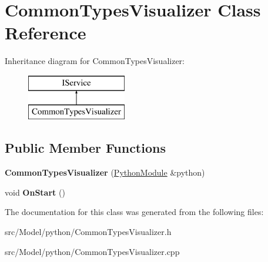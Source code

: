 \hypertarget{classCommonTypesVisualizer}{}\section{Common\+Types\+Visualizer Class Reference}
\label{classCommonTypesVisualizer}
Inheritance diagram for Common\+Types\+Visualizer\+:\begin{figure}[H]
\begin{center}
\leavevmode
\includegraphics[height=2.000000cm]{classCommonTypesVisualizer}
\end{center}
\end{figure}
\subsection*{Public Member Functions}
\begin{DoxyCompactItemize}
\item 
{\bfseries Common\+Types\+Visualizer} (\hyperlink{classPythonModule}{Python\+Module} \&python)\hypertarget{classCommonTypesVisualizer_a30da44a28c61f4b5cb1549bc95ac1d0a}{}\label{classCommonTypesVisualizer_a30da44a28c61f4b5cb1549bc95ac1d0a}

\item 
void {\bfseries On\+Start} ()\hypertarget{classCommonTypesVisualizer_ac0ad0ed9bac76d774d29b4bd99b78866}{}\label{classCommonTypesVisualizer_ac0ad0ed9bac76d774d29b4bd99b78866}

\end{DoxyCompactItemize}


The documentation for this class was generated from the following files\+:\begin{DoxyCompactItemize}
\item 
src/\+Model/python/Common\+Types\+Visualizer.\+h\item 
src/\+Model/python/Common\+Types\+Visualizer.\+cpp\end{DoxyCompactItemize}
